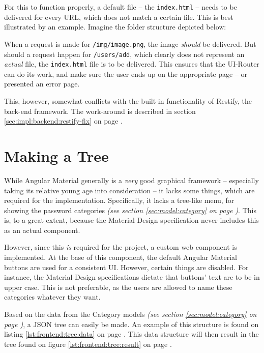 		For this to function properly, a default file -- the \verb=index.html= -- needs to be delivered for every URL, which does not match a certain file. This is best illustrated by an example. Imagine the folder structure depicted below:

		When a request is made for \verb=/img/image.png=, the image \emph{should} be delivered. But should a request happen for \verb=/users/add=, which clearly does not represent an \emph{actual} file, the \verb=index.html= file is to be delivered. This ensures that the UI-Router can do its work, and make sure the user ends up on the appropriate page -- or presented an error page.

		This, however, somewhat conflicts with the built-in functionality of Restify, the back-end framework. The work-around is described in section \ref{sec:impl:backend:restify-fix} on page \pageref{sec:impl:backend:restify-fix}.

	\section{Making a Tree}
		While Angular Material generally is a \emph{very} good graphical framework -- especially taking its relative young age into consideration -- it lacks some things, which are required for the implementation. Specifically, it lacks a tree-like menu, for showing the password categories \emph{(see section \ref{sec:model:category} on page \pageref{sec:model:category})}. This is, to a great extent, because the Material Design specification never includes this as an actual component. 

		However, since this \emph{is} required for the project, a custom web component is implemented. At the base of this component, the default Angular Material buttons are used for a consistent UI. However, certain things are disabled. For instance, the Material Design specifications dictate that buttons' text are to be in upper case. This is not preferable, as the users are allowed to name these categories whatever they want.

		Based on the data from the Category models \emph{(see section \ref{sec:model:category} on page \pageref{sec:model:category})}, a JSON tree can easily be made. An example of this structure is found on listing \ref{lst:frontend:tree:data} on page \pageref{lst:frontend:tree:data}. This data structure will then result in the tree found on figure \ref{lst:frontend:tree:result} on page \pageref{lst:frontend:tree:result}.


